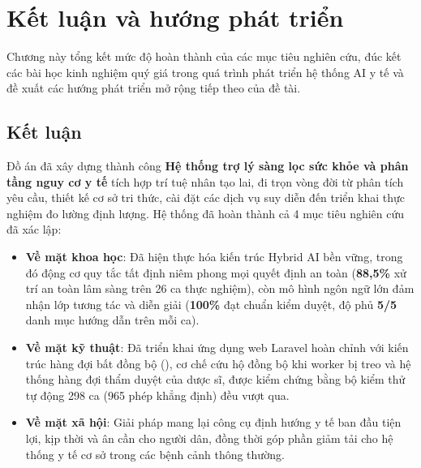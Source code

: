 \chapter{Kết luận và hướng phát triển}
\label{ch:ketluan}

\begin{muctieu}
Chương này tổng kết mức độ hoàn thành của các mục tiêu nghiên cứu, đúc kết các
bài học kinh nghiệm quý giá trong quá trình phát triển hệ thống AI y tế và đề
xuất các hướng phát triển mở rộng tiếp theo của đề tài.
\end{muctieu}

\section{Kết luận}

Đồ án đã xây dựng thành công \textbf{Hệ thống trợ lý sàng lọc sức khỏe và phân
tầng nguy cơ y tế} tích hợp trí tuệ nhân tạo lai, đi trọn vòng đời từ phân tích
yêu cầu, thiết kế cơ sở tri thức, cài đặt các dịch vụ suy diễn đến triển khai
thực nghiệm đo lường định lượng. Hệ thống đã hoàn thành cả 4 mục tiêu nghiên
cứu đã xác lập:

\begin{itemize}[leftmargin=1.6em, itemsep=2pt]
  \item \textbf{Về mặt khoa học}: Đã hiện thực hóa kiến trúc Hybrid AI bền vững,
        trong đó động cơ quy tắc tất định niêm phong mọi quyết định an toàn
        (\textbf{88,5\%} xử trí an toàn lâm sàng trên 26 ca thực nghiệm), còn
        mô hình ngôn ngữ lớn đảm nhận lớp tương tác và diễn giải (\textbf{100\%}
        đạt chuẩn kiểm duyệt, độ phủ \textbf{5/5} danh mục hướng dẫn trên mỗi ca).
  \item \textbf{Về mặt kỹ thuật}: Đã triển khai ứng dụng web Laravel hoàn chỉnh
        với kiến trúc hàng đợi bất đồng bộ (), cơ chế cứu hộ đồng bộ
        khi worker bị treo và hệ thống hàng đợi thẩm duyệt của dược sĩ, được kiểm
        chứng bằng bộ kiểm thử tự động 298 ca (965 phép khẳng định) đều vượt qua.
  \item \textbf{Về mặt xã hội}: Giải pháp mang lại công cụ định hướng y tế ban
        đầu tiện lợi, kịp thời và ân cần cho người dân, đồng thời góp phần giảm
        tải cho hệ thống y tế cơ sở trong các bệnh cảnh thông thường.
\end{itemize}

